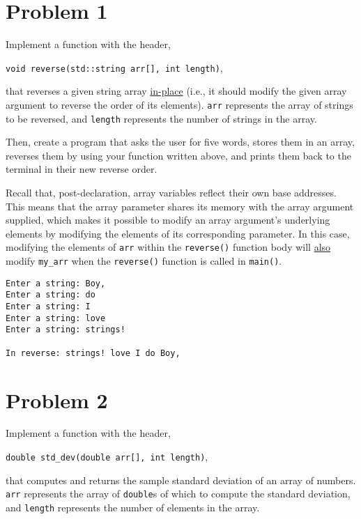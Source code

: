\documentclass{article}
\newenvironment{tip}
    {\begin{tcolorbox}[title=Tip,colframe=white!70!blue,colback=white]}
    {\end{tcolorbox}}
\newcounter{examplerun}
\newenvironment{examplerun}
    {\begin{tcolorbox}[title=Example Run \refstepcounter{examplerun}\theexamplerun,colframe=black!50!green,colback=white,subtitle style={boxrule=0.4pt,
colback=lightgray!80!green}]}
    {\end{tcolorbox}}
\begin{document}
\section{Problem 1}

Implement a function with the header,

\texttt{void reverse(std::string arr[], int length)},

that reverses a given string array \ul{in-place} (i.e., it should modify the given array argument to reverse the order of its elements). \texttt{arr} represents the array of strings to be reversed, and \texttt{length} represents the number of strings in the array.

Then, create a program that asks the user for five words, stores them in an array, reverses them by using your function written above, and prints them back to the terminal in their new reverse order.

\begin{tip}
    Recall that, post-declaration, array variables reflect their own base addresses. This means that the array parameter shares its memory with the array argument supplied, which makes it possible to modify an array argument's underlying elements by modifying the elements of its corresponding parameter. In this case, modifying the elements of \texttt{arr} within the \texttt{reverse()} function body will \underline{also} modify \texttt{my\_arr} when the \texttt{reverse()} function is called in \texttt{main()}.
\end{tip}

\begin{examplerun}
    \begin{verbatim}
Enter a string: Boy,
Enter a string: do
Enter a string: I
Enter a string: love
Enter a string: strings!

In reverse: strings! love I do Boy,
    \end{verbatim}
\end{examplerun}

\section{Problem 2}

Implement a function with the header,

\texttt{double std\_dev(double arr[], int length)},

that computes and returns the sample standard deviation of an array of numbers. \texttt{arr} represents the array of \texttt{double}s of which to compute the standard deviation, and \texttt{length} represents the number of elements in the array.
\end{document}
